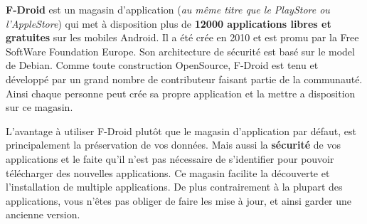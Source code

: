 \textbf{F-Droid} est un magasin d'application (\textit{au même titre que le PlayStore ou l'AppleStore}) qui met à disposition plus de \textbf{12000 applications libres et gratuites} sur les mobiles Android.
Il a été crée en 2010 et est promu par la Free SoftWare Foundation Europe. Son architecture de sécurité est basé sur le model de Debian.
Comme toute construction OpenSource, F-Droid est tenu et développé par un grand nombre de contributeur faisant partie de la communauté. 
Ainsi chaque personne peut crée sa propre application et la mettre a disposition sur ce magasin.

L’avantage à utiliser F-Droid plutôt que le magasin d'application par défaut, est principalement la préservation de vos données. Mais aussi la \textbf{sécurité} de vos applications et le faite qu'il n'est pas nécessaire de s'identifier pour pouvoir télécharger des nouvelles applications. 
Ce magasin facilite la découverte et l'installation de multiple applications. De plus contrairement à la plupart des applications, vous n’êtes pas obliger de faire les mise à jour, et ainsi garder une ancienne version. 
